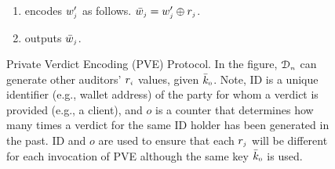\begin{figure}[!htbp]
\begin{center}
\begin{tcolorbox}[enhanced,width=81mm, height=66.5mm, left=0mm,
    drop fuzzy shadow southwest,
    colframe=black,colback=white]
{{\begin{enumerate}[leftmargin=5.2mm]
\item encodes  $w'_{\scriptscriptstyle j}$ as follows. %
%
$\bar w_{\scriptscriptstyle j}= w'_{\scriptscriptstyle j}\oplus r_{\scriptscriptstyle j}$.
%
\item outputs $\bar{ w}_{\scriptscriptstyle j}$.
%
\vspace{-1.4mm}
 \end{enumerate}
 
 
 
}}
\end{tcolorbox}
\end{center}
\vspace{-2mm}
\caption{Private Verdict Encoding  (PVE) Protocol. In the figure, $\mathcal{D}_{\scriptscriptstyle n}$ can generate other auditors' $r_{\scriptscriptstyle i}$ values, given $\bar k_{\scriptscriptstyle 0}$. Note, $\text{ID}$ is a unique identifier (e.g., wallet address) of the party for whom a verdict is provided (e.g., a client), and $o$ is a counter that determines how many times a verdict for the same ID holder has been generated in the past. $\text{ID}$ and $o$ are used to ensure that each $r_{\scriptscriptstyle j}$ will be different for each invocation of PVE  although the same key $\bar k_{\scriptscriptstyle 0}$ is used.} 
\label{fig:PVE}
\end{figure}
%
\vspace{-3mm} 

